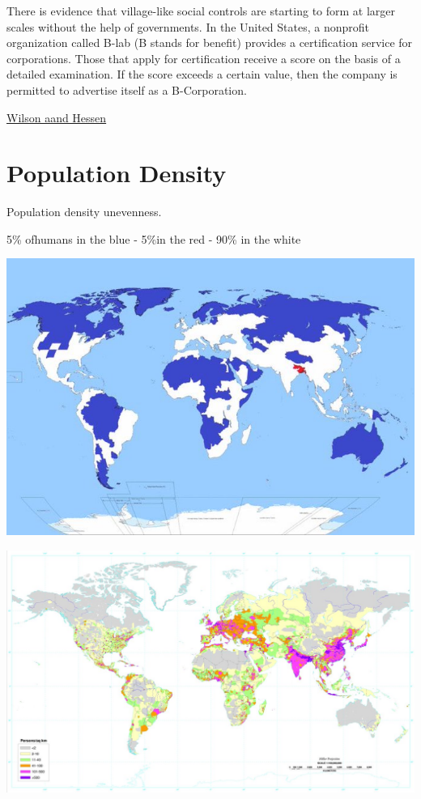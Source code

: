 \documentclass[
]{book}
\begin{document}
There is evidence that village-like social controls are starting to form at larger scales without the help of governments. In the United States, a nonprofit organization called B-lab (B stands for benefit) provides a certification service for corporations. Those that apply for certification receive a score on the basis of a detailed examination. If the score exceeds a certain value, then the company is permitted to advertise itself as a B-Corporation.

\href{https://evonomics.com/norway-toxic-trickle-down-david-sloan-wilson/}{Wilson aand Hessen}

\hypertarget{population-density}{%
\section{Population Density}\label{population-density}}

Population density unevenness.

5\% ofhumans in the blue - 5\%in the red - 90\% in the white

\includegraphics{fig/World_5pct_of_humans_red_blue.jpeg}

\includegraphics{fig/World_Pop_Dens_by_Color.jpeg}
\end{document}
